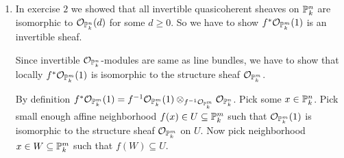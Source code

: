 \newcommand{\sheet}{8}




\maketitle{}

\begin{exercise}{1}
\end{exercise}

\begin{exercise}{2}

\end{exercise}

\begin{exercise}{3}
    \begin{enumerate}
        \item{In exercise $2$ we showed that all invertible quasicoherent
            sheaves on $\mathbb{P}^n_k$ are isomorphic to
            $\mathcal{O}_{\mathbb{P}^n_k}(d)$ for some $d \geq 0$. So we have to show
            $f^* \mathcal{O}_{\mathbb{P}^m_k}(1)$ is an invertible sheaf.

            Since invertible $\mathcal{O}_{\mathbb{P}^n_k}$-modules are same as line
            bundles, we have to show that locally $f^*
            \mathcal{O}_{\mathbb{P}^m_k}(1)$ is isomorphic to the structure sheaf
            $\mathcal{O}_{\mathbb{P}^m_k}$.

            By definition $f^* \mathcal{O}_{\mathbb{P}^m_k}(1) = f^{-1}
            \mathcal{O}_{\mathbb{P}^m_k}(1) \otimes_{f^{-1} \mathcal{O}_{\mathbb{P}^m_k}}
            \mathcal{O}_{\mathbb{P}^n_k}$. Pick some $x \in \mathbb{P}^n_k$. Pick small
            enough affine neighborhood $f(x) \in U \subseteq \mathbb{P}^m_k$ such that
            $\mathcal{O}_{\mathbb{P}^m_k} (1)$ is isomorphic to the structure sheaf
            $\mathcal{O}_{\mathbb{P}^m_k}$ on $U$. Now pick neighborhood $x \in W \subseteq \mathbb{P}^m_k$
            such that $f(W) \subseteq U$.

}
\end{enumerate}
\end{exercise}
